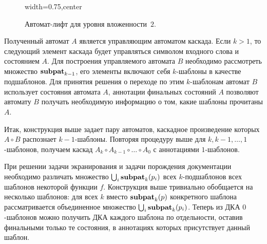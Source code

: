 \begin{figure}[htbp]
  \centering
  \begin{adjustbox}{width=0.75\textwidth,center}
  \end{adjustbox}
  \caption{Автомат-лифт для уровня вложенности~$2$.}
  \label{fig:lift-level2}
\end{figure}

Полученный автомат $A$ является управляющим автоматом каскада. Если $k > 1$, то следующий элемент 
каскада будет управляться символом входного слова и состоянием $A$. Для построения управляемого автомата $B$ необходимо рассмотреть 
множество $\operatorname{\textbf{subpat}}_{k-1}$, его элементы включают себя $k$-шаблоны в качестве подшаблонов. Для принятия решения о переходе по этим $k$-шаблонам автомат $B$ использует состояния автомата $A$, аннотации финальных состояний $A$ позволяют автомату $B$ получать необходимую информацию о том, какие шаблоны прочитаны $A$.

Итак, конструкция выше задает пару автоматов, каскадное произведение которых $A \circ B$ распознает $k-1$-шаблоны. 
Повторяя процедуру выше для $k, k-1, \dots, 1$ -шаблонов, получаем каскад $A_{k} \circ A_{k-1} \circ \dots \circ A_{0}$ с аннотациями $1$-шаблонов.

При решении задачи экранирования и задачи порождения документации необходимо различать множество $\bigcup_i \operatorname{\textbf{subpat}}_k(p_i)$ всех $k$-подшаблонов всех шаблонов 
некоторой функции $f.$
Конструкция выше тривиально обобщается на несколько шаблонов: для всех $k$ вместо $\operatorname{\textbf{subpat}}_k(p)$ конкретного шаблона рассматривается объединенное множество $\bigcup_i \operatorname{\textbf{subpat}}_k(p_i)$. Теперь из ДКА $0$-шаблонов можно получить ДКА каждого 
шаблона по отдельности, оставив финальными только те состояния, в аннотациях которых присутствует данный шаблон. 

